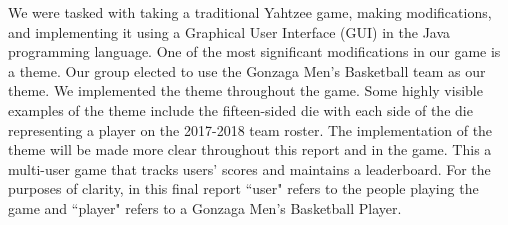 \documentclass[]{report}   %
\begin{document}
We were tasked with taking a traditional Yahtzee game, making modifications, and implementing it using a Graphical User Interface (GUI) in the Java programming language. One of the most significant modifications in our game is a theme. Our group elected to use the Gonzaga Men's Basketball team as our theme. We implemented the theme throughout the game. Some highly visible examples of the theme include the fifteen-sided die with each side of the die representing a player on the 2017-2018 team roster. The implementation of the theme will be made more clear throughout this report and in the game. This a multi-user game that tracks users' scores and maintains a leaderboard. For the purposes of clarity,  in this final report ``user" refers to the people playing the game and ``player" refers to a Gonzaga Men's Basketball Player. 
\end{document}
